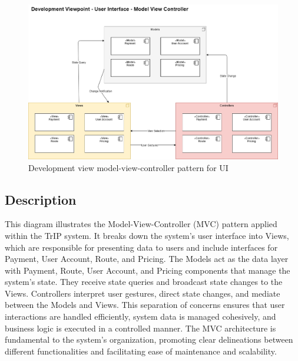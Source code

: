 \begin{figure}[H]
    \centering
    \includegraphics[width=\textwidth]{drawings/views_final_version/development_view_User_Interface.png}
    \caption{Development view model-view-controller pattern for UI}
    \label{fig:development_view_User_Interface}
\end{figure}

\subsection*{Description}
This diagram illustrates the Model-View-Controller (MVC) pattern applied within the TrIP system. It breaks down the system's user interface into Views, which are responsible for presenting data to users and include interfaces for Payment, User Account, Route, and Pricing. The Models act as the data layer with Payment, Route, User Account, and Pricing components that manage the system's state. They receive state queries and broadcast state changes to the Views. Controllers interpret user gestures, direct state changes, and mediate between the Models and Views. This separation of concerns ensures that user interactions are handled efficiently, system data is managed cohesively, and business logic is executed in a controlled manner. The MVC architecture is fundamental to the system's organization, promoting clear delineations between different functionalities and facilitating ease of maintenance and scalability.

